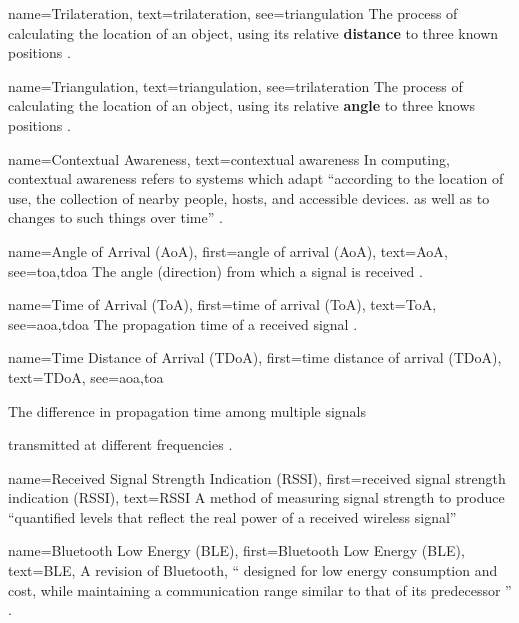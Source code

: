 \newcommand{\abbr}[1]{(#1)}

{
  name={Trilateration},
  text={trilateration},
  see={triangulation}
}
{
  The process of calculating the location of an object,
  using its relative \textbf{distance} to three known
  positions \parencite{triTri}.
}

{
  name={Triangulation},
  text={triangulation},
  see={trilateration}
}
{
  The process of calculating the location of an object,
  using its relative \textbf{angle} to three knows
  positions \parencite{triTri}.
}

{
  name={Contextual Awareness},
  text={contextual awareness}
}
{
  In computing, contextual awareness refers to systems
  which adapt \enquote{according to the location of use,
    the collection of nearby people, hosts, and accessible
    devices. as well as to changes to such things over
    time}
  \parencite{contextAware}.
}

{
  name={Angle of Arrival \abbr{AoA}},
  first={angle of arrival \abbr{AoA}},
  text={AoA},
  see={toa,tdoa}
}
{
  The angle (direction) from which a signal is received
  \parencite{suveryOfCellPos}.
}

{
  name={Time of Arrival \abbr{ToA}},
  first={time of arrival \abbr{ToA}},
  text={ToA},
  see={aoa,tdoa}
}
{
  The propagation time of a received signal
  \parencite{suveryOfCellPos}.
}

{
  name={Time Distance of Arrival \abbr{TDoA}},
  first={time distance of arrival \abbr{TDoA}},
  text={TDoA},
  see={aoa,toa}
}
{
  The difference in propagation time among multiple signals

  transmitted at different frequencies
  \parencite{suveryOfCellPos}.
}

{
  name={Received Signal Strength Indication \abbr{RSSI}},
  first={received signal strength indication \abbr{RSSI}},
  text={RSSI}
}
{
  A method of measuring signal strength to produce
  \enquote{quantified levels that reflect the real power of
    a received wireless signal} \parencite{suveryOfCellPos}
}

{
  name={Bluetooth Low Energy (BLE)},
  first={Bluetooth Low Energy (BLE)},
  text={BLE},
}
{
  A revision of Bluetooth, \enquote{
    designed for low energy consumption and cost, while
    maintaining a communication range similar to that of
    its predecessor
  } \parencite{usingBluetoothBeacons}.
}


